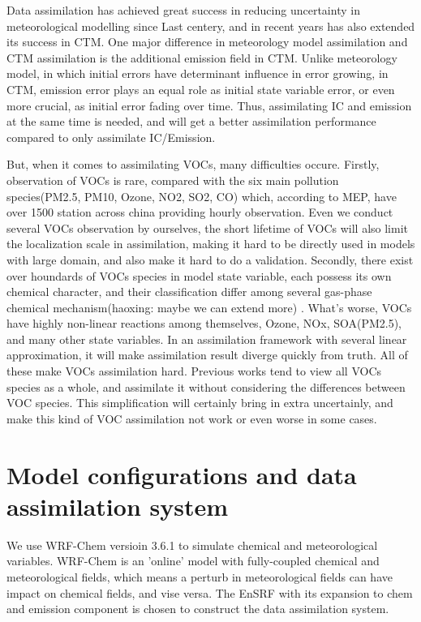 \documentclass{ametsocV6.1}
\begin{document}
Data assimilation has achieved great success in reducing uncertainty in meteorological modelling since Last centery, and in recent years has also extended its success in CTM. One major difference in meteorology model assimilation and CTM assimilation is the additional emission field in CTM. Unlike meteorology model, in which initial errors have determinant influence in error growing, in CTM, emission error plays an equal role as initial state variable error, or even more crucial, as initial error fading over time\citep{Sandu_2011}. Thus, assimilating IC and emission at the same time is needed, and will get a better assimilation performance compared to only assimilate IC/Emission\citep{Elbern_2007, Tang_2011}.

But, when it comes to assimilating VOCs, many difficulties occure. Firstly, observation of VOCs is rare, compared with the six main pollution species(PM2.5, PM10, Ozone, NO2, SO2, CO) which, according to MEP, have over 1500 station across china providing hourly observation. Even we conduct several VOCs observation by ourselves, the short lifetime of VOCs will also limit the localization scale in assimilation\citep{Koohkan_2013}, making it hard to be directly used in models with large domain, and also make it hard to do a validation. Secondly, there exist over houndards of VOCs species in model state variable, each possess its own chemical character, and their classification differ among several gas-phase chemical mechanism(haoxing: maybe we can extend more) . What's worse, VOCs have highly non-linear reactions among themselves, Ozone, NOx, SOA(PM2.5), and many other state variables. In an assimilation framework with several linear approximation, it will make assimilation result diverge quickly from truth\citep{Tang_2016}. All of these make VOCs assimilation hard. Previous works tend to view all VOCs species as a whole, and assimilate it without considering the differences between VOC species\citep{Tang_2011, Ma_2019, Xing_2020}. This simplification will certainly bring in extra uncertainly, and make this kind of VOC assimilation not work or even worse in some cases.

\section{Model configurations and data assimilation system}
We use WRF-Chem versioin 3.6.1 to simulate chemical and meteorological variables\citep{Grell_2005}. WRF-Chem is an 'online' model with fully-coupled chemical and meteorological fields, which means a perturb in meteorological fields can have impact on chemical fields, and vise versa. The EnSRF\citep{Whitaker_2002} with its expansion to chem and emission component\citep{Schwartz_2014, Peng_2017} is chosen to construct the data assimilation system.
\end{document}
